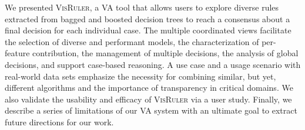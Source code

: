 We presented \textsc{VisRuler}, a VA tool that allows users to explore diverse rules extracted from bagged and boosted decision trees to reach a consensus about a final decision for each individual case. The multiple coordinated views facilitate the selection of diverse and performant models, the characterization of per-feature contribution, the management of multiple decisions, the analysis of global decisions, and support case-based reasoning. A use case and a usage scenario with real-world data sets emphasize the necessity for combining similar, but yet, different algorithms and the importance of transparency in critical domains. We also validate the usability and efficacy of \textsc{VisRuler} via a user study. Finally, we describe a series of limitations of our VA system with an ultimate goal to extract future directions for our work.